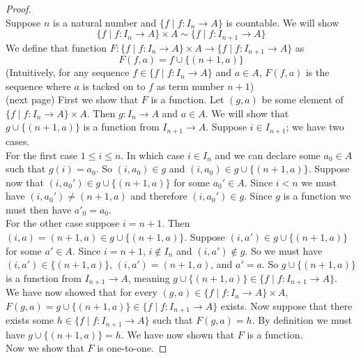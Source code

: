 \documentclass{report}
\theoremstyle{definition}
\begin{document}
\begin{proof}
\begin{equation*}
\end{equation*}
Suppose $n$ is a natural number and $\{f\mid f:I_n\to A\}$ is countable. We will show 
\begin{equation*}
\{f\mid f:I_n\to A\}\times A\sim\{f\mid f:I_{n+1}\to A\}
\end{equation*}
We define that function $F:\{f\mid f:I_n\to A\}\times A\to\{f\mid f:I_{n+1}\to A\}$ as
\begin{equation*}
F(f,a)=f\cup\{(n+1,a)\}
\end{equation*}
(Intuitively, for any sequence $f\in\{f\mid f:I_n\to A\}$ and $a\in A$, $F(f,a)$ is the sequence where $a$ is tacked on to $f$ as term number $n+1$)\\
(next page)\newpage
First we show that $F$ is a function. Let $(g,a)$ be some element of $\{f\mid f:I_n\to A\}\times A$. Then $g:I_n\to A$ and $a\in A$. We will show that $g\cup\{(n+1,a)\}$ is a function from 
$I_{n+1}\to A$. Suppose $i\in I_{n+1}$; we have two cases.\\
\indent For the first case $1\leq i\leq n$. In which case $i\in I_n$ and we can declare some $a_0\in A$ such that $g(i)=a_0$. So $(i,a_0)\in g$ and $(i,a_0)\in g\cup\{(n+1,a)\}$. 
Suppose now that $(i,a_0')\in g\cup\{(n+1,a)\}$ for some $a_0'\in A$. Since $i<n$ we must have $(i,a_0')\neq (n+1,a)$ and therefore $(i,a_0')\in g$. Since $g$ is a function we must then have
$a'_0=a_0$.\\
\indent For the other case suppose $i=n+1$. Then $(i,a)=(n+1,a)\in g\cup\{(n+1,a)\}$.
Suppose $(i,a')\in g\cup\{(n+1,a)\}$ for some $a'\in A$. Since $i=n+1$, $i\notin I_n$ and $(i,a')\notin g$. So we must have $(i,a')\in\{(n+1,a)\}$, $(i,a')=(n+1,a)$, and $a'=a$. So $g\cup\{(n+1,a)\}$ is a function from 
$I_{n+1}\to A$, meaning $g\cup\{(n+1,a)\}\in\{f\mid f:I_{n+1}\to A\}$.\\
\indent We have now showed that for every $(g,a)\in\{f\mid f:I_n\to A\}\times A$, $F(g,a)=g\cup\{(n+1,a)\}\in\{f\mid f:I_{n+1}\to A\}$ exists. 
Now suppose that there exists some $h\in\{f\mid f:I_{n+1}\to A\}$ such that $F(g,a)=h$.
By definition we must have $g\cup\{(n+1,a)\}=h$. We have now shown that $F$ is a function.\\
\indent Now we show that $F$ is one-to-one.












\end{proof}
\end{document}
